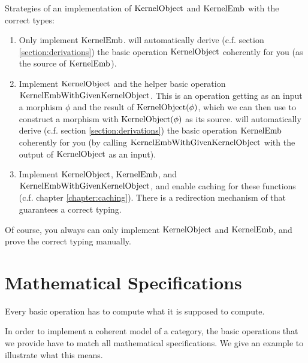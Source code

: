 \begin{example}
 Strategies of an implementation of $\mathrm{KernelObject}$ and $\mathrm{KernelEmb}$ with the correct types:
 \begin{enumerate}
  \item Only implement $\mathrm{KernelEmb}$. \CapPkg will automatically derive (c.f. section \ref{section:derivations}) the basic operation
        $\mathrm{KernelObject}$ coherently for you (as the source of $\mathrm{KernelEmb}$).
  \item Implement $\mathrm{KernelObject}$ and the helper basic operation $\mathrm{KernelEmbWithGivenKernelObject}$.
        This is an operation getting as an input a morphism $\phi$ and the result of $\mathrm{KernelObject}( \phi )$,
        which we can then use to construct a morphism with $\mathrm{KernelObject}( \phi )$ as its source. 
        \CapPkg will automatically derive (c.f. section \ref{section:derivations}) the basic operation
        $\mathrm{KernelEmb}$ coherently for you (by calling $\mathrm{KernelEmbWithGivenKernelObject}$ with the output of $\mathrm{KernelObject}$ as an input).
  \item Implement $\mathrm{KernelObject}$, $\mathrm{KernelEmb}$, and $\mathrm{KernelEmbWithGivenKernelObject}$, and enable caching for these functions (c.f. chapter \ref{chapter:caching}).
        There is a  redirection mechanism of \CapPkg that guarantees a correct typing.
 \end{enumerate}
 Of course, you always can only implement $\mathrm{KernelObject}$ and $\mathrm{KernelEmb}$, and prove the correct typing manually.
\end{example}



\section{Mathematical Specifications}

\begin{specification}
 Every basic operation has to compute what it is supposed to compute.
\end{specification} 

In order to implement a coherent model of a category, the basic operations that we provide have to match all mathematical
specifications. We give an example to illustrate what this means.

